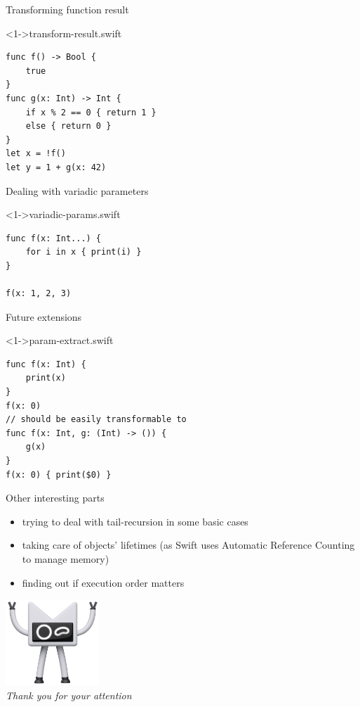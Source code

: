 \documentclass[hyperref={pdfpagelabels=false},xcolor={dvipsnames},compress,table,usenames,dvipsnames]{beamer}
\begin{document}
    \begin{frame}[fragile]{Transforming function result}
        \begin{exampleblock}
            <1->{transform-result.swift}
            \begin{lstlisting}
func f() -> Bool {
    true
}
func g(x: Int) -> Int {
    if x % 2 == 0 { return 1 }
    else { return 0 }
}
let x = !f()
let y = 1 + g(x: 42)
            \end{lstlisting}
        \end{exampleblock}
    \end{frame}

    \begin{frame}[fragile]{Dealing with variadic parameters}
        \begin{exampleblock}
            <1->{variadic-params.swift}
            \begin{lstlisting}
func f(x: Int...) {
    for i in x { print(i) }
}

f(x: 1, 2, 3)
            \end{lstlisting}
        \end{exampleblock}
    \end{frame}

    \begin{frame}[fragile]{Future extensions}
        \begin{exampleblock}
            <1->{param-extract.swift}
            \begin{lstlisting}
func f(x: Int) {
    print(x)
}
f(x: 0)
// should be easily transformable to
func f(x: Int, g: (Int) -> ()) {
    g(x)
}
f(x: 0) { print($0) }
            \end{lstlisting}
        \end{exampleblock}
    \end{frame}

    \begin{frame}[fragile]{Other interesting parts}
        \begin{itemize}
            \item trying to deal with tail-recursion in some basic cases\pause
            \item taking care of objects' lifetimes (as Swift uses Automatic Reference Counting to manage memory)\pause
            \item finding out if execution order matters
        \end{itemize}
    \end{frame}

    {
        \begin{frame}{}
            \centering
            \includegraphics[width=100pt]{images/blink.png}\\\vspace{1cm}
            \emph{\Large Thank you for your attention}
        \end{frame}
    }
\end{document}
